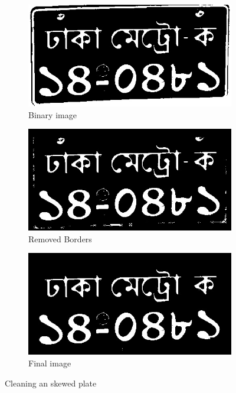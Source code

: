 \begin{figure}
\begin{subfigure}{0.33\textwidth}
    \centering
    \includegraphics[width=0.9\linewidth]{./img/experiment/stage.14/00-00-good3}
    \caption{Binary image}
\end{subfigure}
\begin{subfigure}{0.33\textwidth}
    \centering
    \includegraphics[width=0.9\linewidth]{./img/experiment/stage.15/00-00-good3}
    \caption{Removed Borders}
\end{subfigure}
\begin{subfigure}{0.33\textwidth}
    \centering
    \includegraphics[width=0.9\linewidth]{./img/experiment/stage.16/00-00-good3}
    \caption{Final image}
\end{subfigure}
\caption{Cleaning an skewed plate}
\label{fig:Cleaning3}
\end{figure}


